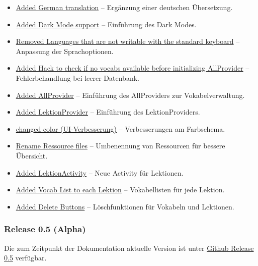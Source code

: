\documentclass[12pt,a4paper]{article}
\begin{document}
\begin{itemize}
    \item \href{https://github.com/Erik-Donath/Palabra/commit/6e4982769e27744cca8d112e1807f76f4ff160de}{Added German translation} -- Ergänzung einer deutschen Übersetzung.
    \item \href{https://github.com/Erik-Donath/Palabra/commit/4bc28a645fe7c87899ccc57ef4d8a160bfef4d85}{Added Dark Mode support} -- Einführung des Dark Modes.
    \item \href{https://github.com/Erik-Donath/Palabra/commit/bf8beefcf7cca51e4da28855030c7488e79f9806}{Removed Languages that are not writable with the standard keyboard} -- Anpassung der Sprachoptionen.
    \item \href{https://github.com/Erik-Donath/Palabra/commit/3b6bec27e538deed545c870dd79b3046855a1120}{Added Hack to check if no vocabs available before initializing AllProvider} -- Fehlerbehandlung bei leerer Datenbank.
    \item \href{https://github.com/Erik-Donath/Palabra/commit/2a7ab3cd174015657479552cb8bf8bb52b9a2f8b}{Added AllProvider} -- Einführung des AllProviders zur Vokabelverwaltung.
    \item \href{https://github.com/Erik-Donath/Palabra/commit/525dcb48f3128b1463a836a1db68a558072ab39c}{Added LektionProvider} -- Einführung des LektionProviders.
    \item \href{https://github.com/Erik-Donath/Palabra/commit/51ced0c599b4e4707231b10cbceea484b169148a}{changed color (UI-Verbesserung)} -- Verbesserungen am Farbschema.
    \item \href{https://github.com/Erik-Donath/Palabra/commit/5cb0c4cd391b8ec789e4889fd4ed4bf5be747797}{Rename Ressource files} -- Umbenennung von Ressourcen für bessere Übersicht.
    \item \href{https://github.com/Erik-Donath/Palabra/commit/b1787998fa5c91b92e6411b9339e7b51cbdd347b}{Added LektionActivity} -- Neue Activity für Lektionen.
    \item \href{https://github.com/Erik-Donath/Palabra/commit/39da77321c858532260274ccc76ad0458cea806d}{Added Vocab List to each Lektion} -- Vokabellisten für jede Lektion.
    \item \href{https://github.com/Erik-Donath/Palabra/commit/7f204528d8f7df18da4316c6c8b84396d3c45299}{Added Delete Buttons} -- Löschfunktionen für Vokabeln und Lektionen.
\end{itemize}

\subsubsection{Release 0.5 (Alpha)}
Die zum Zeitpunkt der Dokumentation aktuelle Version ist unter \href{https://github.com/Erik-Donath/Palabra/releases/tag/0.5}{Github Release 0.5} verfügbar.
\end{document}
